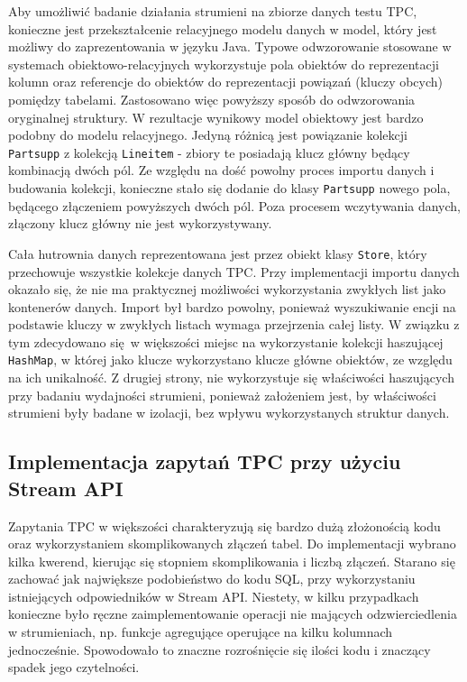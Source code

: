 \documentclass[12pt]{extarticle}
\begin{document}
    Aby umożliwić badanie działania strumieni na zbiorze danych testu TPC, konieczne jest przekształcenie relacyjnego modelu danych w model, który jest możliwy do zaprezentowania w języku Java. Typowe odwzorowanie stosowane w systemach obiektowo-relacyjnych wykorzystuje pola obiektów do reprezentacji kolumn oraz referencje do obiektów do reprezentacji powiązań (kluczy obcych) pomiędzy tabelami. Zastosowano więc powyższy sposób do odwzorowania oryginalnej struktury. W rezultacje wynikowy model obiektowy jest bardzo podobny do modelu relacyjnego. Jedyną różnicą jest powiązanie kolekcji \texttt{Partsupp} z kolekcją \texttt{Lineitem} - zbiory te posiadają klucz główny będący kombinacją dwóch pól. Ze względu na dość powolny proces importu danych i budowania kolekcji, konieczne stało się dodanie do klasy \texttt{Partsupp} nowego pola, będącego złączeniem powyższych dwóch pól. Poza procesem wczytywania danych, złączony klucz główny nie jest wykorzystywany.

    Cała hutrownia danych reprezentowana jest przez obiekt klasy \texttt{Store}, który przechowuje wszystkie kolekcje danych TPC. Przy implementacji importu danych okazało się, że nie ma praktycznej możliwości wykorzystania zwykłych list jako kontenerów danych. Import był bardzo powolny, ponieważ wyszukiwanie encji na podstawie kluczy w zwykłych listach wymaga przejrzenia całej listy. W związku z tym zdecydowano się w większości miejsc na wykorzystanie kolekcji haszującej \texttt{HashMap}, w której jako klucze wykorzystano klucze główne obiektów, ze względu na ich unikalność. Z drugiej strony, nie wykorzystuje się właściwości haszujących przy badaniu wydajności strumieni, ponieważ założeniem jest, by właściwości strumieni były badane w izolacji, bez wpływu wykorzystanych struktur danych.


\subsection{Implementacja zapytań TPC przy użyciu Stream API}

Zapytania TPC w większości charakteryzują się bardzo dużą złożonością kodu oraz wykorzystaniem skomplikowanych złączeń tabel. Do implementacji wybrano kilka kwerend, kierując się stopniem skomplikowania i liczbą złączeń. Starano się zachować jak największe podobieństwo do kodu SQL, przy wykorzystaniu istniejących odpowiedników w Stream API. Niestety, w kilku przypadkach konieczne było ręczne zaimplementowanie operacji nie mających odzwierciedlenia w strumieniach, np. funkcje agregujące operujące na kilku kolumnach jednocześnie. Spowodowało to znaczne rozrośnięcie się ilości kodu i znaczący spadek jego czytelności. 
\end{document}
